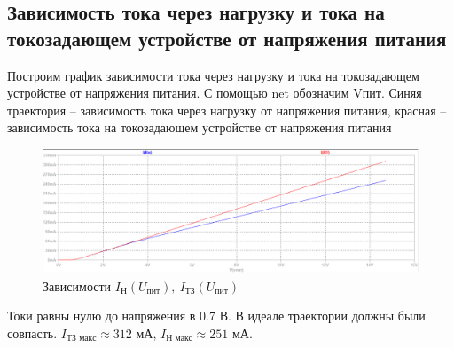 \documentclass[a4paper, 12pt]{article}
\begin{document}
    \subsection{Зависимость тока через нагрузку и тока на токозадающем устройстве от напряжения питания}
    Построим график зависимости тока через нагрузку и тока на токозадающем устройстве от напряжения питания.
    С помощью net обозначим Vпит. Синяя траектория -- зависимость тока через нагрузку от напряжения питания,
    красная -- зависимость тока на токозадающем устройстве от напряжения питания
    \begin{figure}[H]
        \centering
        \includegraphics[scale=0.46]{1task_Iн(Vпит)_Iтз(Vпит).png}
        \captionsetup{skip=0pt}
        \caption{Зависимости $I_\text{Н}\left( U_\text{пит} \right),\ I_\text{ТЗ}\left( U_\text{пит} \right)$}
        \label{fig:1task_InVl_ItzVl}
    \end{figure}
    \noindent Токи равны нулю до напряжения в 0.7 В. В идеале траектории должны были совпасть. $I_\text{ТЗ макс}\approx312$ мА,
    $I_\text{Н макс}\approx251$ мА.
\end{document}
